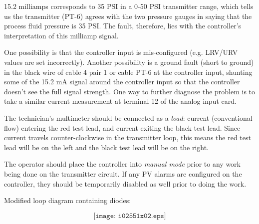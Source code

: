 












15.2 milliamps corresponds to 35 PSI in a 0-50 PSI transmitter range, which tells us the transmitter (PT-6) agrees with the two pressure gauges in saying that the process fluid pressure is 35 PSI.  The fault, therefore, lies with the controller's interpretation of this milliamp signal.

One possibility is that the controller input is mis-configured (e.g. LRV/URV values are set incorrectly).  Another possibility is a ground fault (short to ground) in the black wire of cable 4 pair 1 or cable PT-6 at the controller input, shunting some of the 15.2 mA signal around the controller input so that the controller doesn't see the full signal strength.  One way to further diagnose the problem is to take a similar current measurement at terminal 12 of the analog input card.

\vskip 10pt

The technician's multimeter should be connected as a {\it load}: current (conventional flow) entering the red test lead, and current exiting the black test lead.  Since current travels counter-clockwise in the transmitter loop, this means the red test lead will be on the left and the black test lead will be on the right.

\vskip 10pt

The operator should place the controller into {\it manual mode} prior to any work being done on the transmitter circuit.  If any PV alarms are configured on the controller, they should be temporarily disabled as well prior to doing the work.

\vskip 10pt

Modified loop diagram containing diodes:

$$\texttt{[image: i02551x02.eps]}$$




